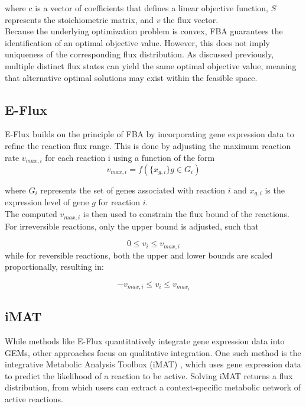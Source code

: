where c is a vector of coefficients that defines a linear objective function, $S$ represents the stoichiometric matrix, and $v$ the flux vector.
\\

Because the underlying optimization problem is convex, FBA guarantees the identification of an optimal objective value. However, this does not imply uniqueness of the corresponding flux distribution. As discussed previously, multiple distinct flux states can yield the same optimal objective value, meaning that alternative optimal solutions may exist within the feasible space. 

\subsection{E-Flux}
E-Flux \citep{colijnInterpretingExpressionData2009} builds on the principle of FBA by incorporating gene expression data to refine the reaction flux range. This is done by adjusting the maximum reaction rate $v_{max,i}$  for each reaction i using a function of the form
\\

\begin{equation}
    v_{max,i} = f(\{x_{g,i}\} g \in G_i)
    \label{eq:Eflux}
\end{equation}

where $G_i$ represents the set of genes associated with reaction $i$ and $x_{g,i}$ is the expression level of gene $g$ for reaction $i$.
\\

The computed $v_{max,i}$ is then used to constrain the flux bound of the reactions. For irreversible reactions, only the upper bound is adjusted, such that 

\begin{equation*}
    0 \le v_i \le v_{max,i}
\end{equation*}
while for reversible reactions, both the upper and lower bounds are scaled proportionally, resulting in: 

\begin{equation}
    -v_{max,i} \le v_i \le v_{max_i}
    \label{eq:Eflux_bounds}
\end{equation}

\subsection{iMAT}
While methods like E-Flux quantitatively integrate gene expression data into GEMs, other approaches focus on qualitative integration. One such method is the integrative Metabolic Analysis Toolbox (iMAT) \citep{SHLOMINetworkbasedPredictionHuman2008},
which uses gene expression data to predict the likelihood of a reaction to be active. Solving iMAT returns a flux distribution, from which users can extract a context-specific metabolic network of active reactions. 
\\

